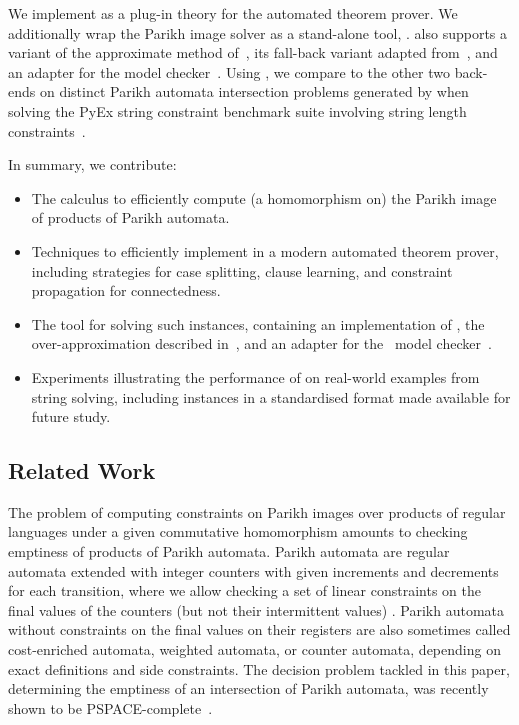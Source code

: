 We implement \Calculus{} as a plug-in theory for the \Princess{} automated
theorem prover.
%
We additionally wrap the Parikh image solver as a stand-alone tool, \Catra.
\Catra{} also supports a variant of the approximate method of~\cite{approximate-parikh}, its fall-back variant adapted
from~\cite{generate-parikh-image}, and an adapter for the \Nuxmv{} model
checker~\cite{nuxmv}. Using \Catra, we compare \Calculus{} to the other two
back-ends on \NrBenchmarks{} distinct Parikh automata intersection problems
generated by \OstrichPlus{} when solving the PyEx string constraint benchmark
suite involving string length constraints~\cite{pyex}.



In summary, we contribute:
\begin{itemize}
    \item The \Calculus{} calculus to efficiently compute (a homomorphism on)
          the Parikh image of products of Parikh automata.
    \item Techniques to efficiently implement \Calculus{} in a modern
    automated theorem prover, including strategies for case splitting, clause
    learning, and constraint propagation for connectedness.
    \item The \Catra{} tool for solving such instances, containing an
    implementation of \Calculus{}, the over-approximation described
    in~\cite{approximate-parikh}, and an adapter for the~\Nuxmv{} model
    checker~\cite{nuxmv}.
    \item Experiments illustrating the performance of \Calculus{} on real-world
    examples from string solving, including \NrBenchmarks{} instances in a
    standardised format made available for future study.
\end{itemize}

\subsection{Related Work}

The problem of computing constraints on Parikh images over products of regular
languages under a given commutative homomorphism amounts to checking emptiness
of products of
Parikh automata. Parikh automata are regular automata extended with integer
counters with given increments and decrements for each transition, where we
allow checking a set of linear constraints on the final values of the counters
(but not their intermittent values) \cite{parikh-automata}. Parikh automata
without constraints on the final values on their registers are also sometimes
called cost-enriched automata, weighted automata, or counter automata, depending
on exact definitions and side constraints. The decision problem tackled in this
paper, determining the emptiness of an intersection of Parikh automata, was
recently shown to be PSPACE-complete~\cite{graph-queries}.

